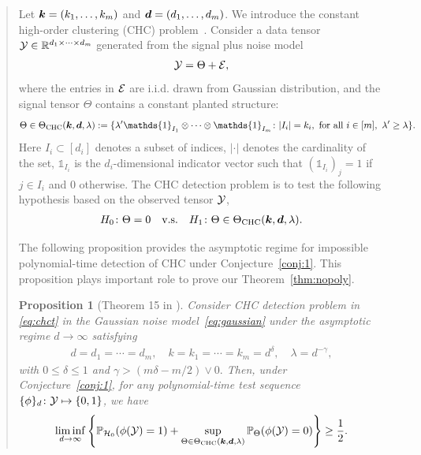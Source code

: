 \documentclass[11pt]{article}
\theoremstyle{plain}
\newtheorem{prop}{Proposition}
\theoremstyle{definition}
\begin{document}
\begin{enumerate}[wide, labelwidth=!, labelindent=0pt]
\begin{quote}
Let $\bm{k} = (k_1,\ldots,k_m)$ and $\bm{d} = (d_1,\ldots,d_m)$. We introduce the constant high-order clustering (CHC) problem~\citep{luo2022tensor}. Consider a data tensor $\mathcal{Y}\in\mathbb{R}^{d_1\times \cdots \times d_m}$ generated from the signal plus noise model
\begin{equation}\label{eq:gaussian}
\mathcal{Y}=\Theta+\mathcal{E}, 
\end{equation}
where the entries in $\mathcal{E}$ are i.i.d. drawn from Gaussian distribution, and the signal tensor $\Theta$ contains a constant planted structure:
\begin{align}\label{eq:chcdef}
    \Theta\in\Theta_{\text{CHC}}(\mk,\md,\lambda) :=\{\lambda'\mathds{1}_{I_1}\otimes \cdots\otimes \mathds{1}_{I_m}\colon|I_i| = k_i,\ \text{for all }i\in[m],\ \lambda' \geq \lambda\}.
\end{align}
Here $I_i\subset [d_i]$ denotes a subset of indices, $|\cdot|$ denotes the cardinality of the set, $\mathds{1}_{I_i}$ is the $d_i$-dimensional indicator vector such that $(\mathds{1}_{I_i})_j = 1$ if $j\in I_i$ and 0 otherwise. The CHC detection problem is to test the following hypothesis based on the observed tensor $\mathcal{Y}$, 
\begin{align}\label{eq:chct}
    H_0\colon \Theta = 0\quad\text{v.s.}\quad H_1\colon \Theta\in\Theta_{\text{CHC}}(\bm{k},\bm{d},\lambda).
\end{align}

The following proposition provides the asymptotic regime for impossible polynomial-time detection of CHC under Conjecture~\ref{conj:1}. This proposition plays important role to prove our Theorem~\ref{thm:nopoly}.
 \begin{prop}[Theorem 15 in \citep{luo2022tensor}]\label{prop:CHC} 
Consider CHC detection problem in \eqref{eq:chct} in the Gaussian noise model~\eqref{eq:gaussian} under the asymptotic regime $d\rightarrow\infty$ satisfying
\begin{align}\label{eq:equal}
  d =  d_1= \cdots= d_m ,\quad
    k = k_1 = \cdots = k_m = d^\delta,\quad \lambda  = d^{-\gamma},
\end{align}with $0\leq\delta\leq1$ and $\gamma >(m\delta-m/2)\vee 0.$ Then, under Conjecture~\ref{conj:1}, for any polynomial-time test sequence $\{\phi\}_d\colon \mathcal{Y}\mapsto\{0,1\}$, we have
\begin{align}
    \liminf_{d\rightarrow\infty} \left\{\mathbb{P}_{\mathcal{H}_0}(\phi(\mathcal{Y}) = 1)+ \sup_{\Theta\in\Theta_{\textup{CHC}}(\bm{k},\bm{d},\lambda)}\mathbb{P}_{\Theta}(\phi(\mathcal{Y}) =0) \right\}\geq\frac{1}{2}.
\end{align}
\end{prop}



\end{quote}
\end{enumerate}
\end{document}
